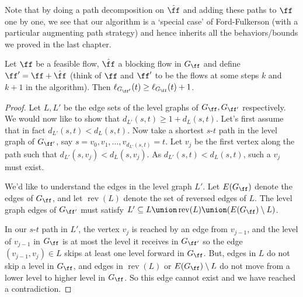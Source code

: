 Note that by doing a path decomposition on $\hat{\ff}$ and adding these paths to $\ff$ one by one, we see that
our algorithm is a `special case' of Ford-Fulkerson (with a particular augmenting path strategy) and hence
inherits all the behaviors/bounds we proved in the last chapter.

\begin{lemma}
  Let $\ff$ be a feasible flow, $\hat{\ff}$ a blocking flow in $G_{\ff}$ and define $\ff' = \ff+\hat{\ff}$ (think
  of $\ff$ and $\ff'$ to be the flows at some steps $k$ and $k+1$ in the algorithm). Then
  $\ell_{G_{\ff'}}(t) \geq \ell_{G_{\ff}}(t) + 1$.
\end{lemma}
\begin{proof}
  Let $L, L'$ be the edge sets of the level graphs of $G_{\ff}, G_{\ff'}$
  respectively.
  We would now like to show that $d_{L'}(s, t) \geq 1 + d_L(s, t)$. Let's first assume that in fact
  $d_{L'}(s, t) < d_L(s, t)$. Now take a shortest $s$-$t$ path in the level graph of
  $G_{\ff'}$, say $s=v_0, v_1, \dots, v_{d_{L'}(s, t)} =  t$.
  Let $v_j$ be the first vertex along the path such that
  $d_{L'}(s, v_j) < d_L(s, v_j)$.
  As $d_{L'}(s, t) < d_L(s, t)$, such a $v_j$ must exist.

  We'd like to understand the edges in the level
  graph $L'$.
  Let $E(G_{\ff})$ denote the edges of $G_{\ff}$,
  and let $\operatorname{rev}(L)$ denote the set of
  reversed edges of $L$.
  The level graph edges of $G_{\ff'}$ must satisfy
  $L' \subseteq L \union
  \operatorname{rev}(L) \union (E(G_{\ff}) \setminus
  L)$.

  In our $s$-$t$ path in $L'$, the vertex $v_j$ is reached by an edge from $v_{j-1}$,
  and the level of $v_{j-1}$ in $G_{\ff}$ is at most the level it receives in $G_{\ff'}$
  so the edge $(v_{j-1},v_j) \in L$ skips
  at least one level forward  in $G_{\ff}$.
  But, edges in $L$ do not skip a level in
  $G_{\ff}$, and edges in
  $\operatorname{rev}(L)$ or
  $E(G_{\ff}) \setminus L$ do not move from a lower level to higher
  level in $G_{\ff}$.
  So this edge cannot exist and we have reached a contradiction.


\end{proof}

